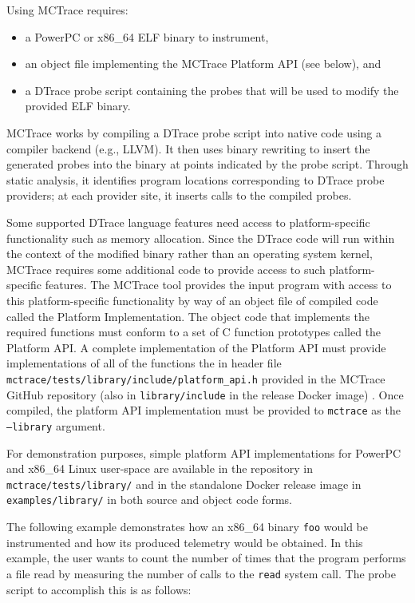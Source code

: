 Using MCTrace requires:
\begin{itemize}
\item a PowerPC or x86\_64 ELF binary to instrument,
\item an object file implementing the MCTrace Platform API (see below), and
\item a DTrace probe script containing the probes that will be used to
  modify the provided ELF binary.
\end{itemize}

MCTrace works by compiling a DTrace probe script into native code using
a compiler backend (e.g., LLVM). It then uses binary rewriting to
insert the generated probes into the binary at points indicated by the
probe script. Through static analysis, it identifies program locations
corresponding to DTrace probe providers; at each provider site, it
inserts calls to the compiled probes.

Some supported DTrace language features need access to platform-specific
functionality such as memory allocation. Since the DTrace code
will run within the context of the modified binary rather than an
operating system kernel, MCTrace requires some additional code to
provide access to such platform-specific features. The MCTrace tool
provides the input program with access to this platform-specific
functionality by way of an object file of compiled code called the
Platform Implementation. The object code that implements the required
functions must conform to a set of C function prototypes called the
Platform API. A complete implementation of the Platform API must
provide implementations of all of the functions the in header file
\texttt{mctrace/tests/library/include/platform\_api.h} provided in the
MCTrace GitHub repository (also in \texttt{library/include} in the
release Docker image) . Once compiled, the platform API implementation
must be provided to \texttt{mctrace} as the \texttt{--library} argument.

For demonstration purposes, simple platform API implementations for
PowerPC and x86\_64 Linux user-space are available in the repository
in \texttt{mctrace/tests/library/} and in the standalone Docker release image in
\texttt{examples/library/} in both source and object code forms.

The following example demonstrates how an x86\_64 binary
  \texttt{foo} would be instrumented and how its produced telemetry
  would be obtained. In this example, the user wants to count the number
  of times that the program performs a file read by measuring the number
  of calls to the \texttt{read} system call. The probe script to
    accomplish this is as follows:

